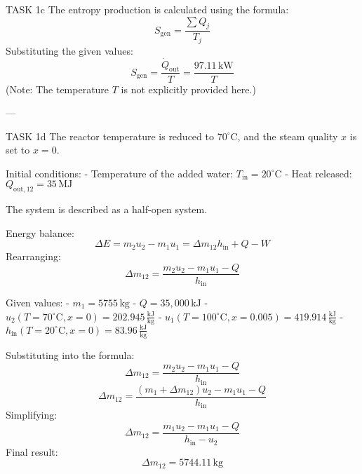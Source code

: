 TASK 1c  
The entropy production is calculated using the formula:  
\[
S_{\text{gen}} = \frac{\sum Q_j}{T_j}
\]  
Substituting the given values:  
\[
S_{\text{gen}} = \frac{\dot{Q}_{\text{out}}}{T} = \frac{97.11 \, \text{kW}}{T}
\]  
(Note: The temperature \( T \) is not explicitly provided here.)

---

TASK 1d  
The reactor temperature is reduced to \( 70^\circ\text{C} \), and the steam quality \( x \) is set to \( x = 0 \).  

Initial conditions:  
- Temperature of the added water: \( T_{\text{in}} = 20^\circ\text{C} \)  
- Heat released: \( Q_{\text{out},12} = 35 \, \text{MJ} \)  

The system is described as a half-open system.  

Energy balance:  
\[
\Delta E = m_2 u_2 - m_1 u_1 = \Delta m_{12} h_{\text{in}} + Q - W
\]  
Rearranging:  
\[
\Delta m_{12} = \frac{m_2 u_2 - m_1 u_1 - Q}{h_{\text{in}}}
\]  

Given values:  
- \( m_1 = 5755 \, \text{kg} \)  
- \( Q = 35,000 \, \text{kJ} \)  
- \( u_2(T=70^\circ\text{C}, x=0) = 202.945 \, \frac{\text{kJ}}{\text{kg}} \)  
- \( u_1(T=100^\circ\text{C}, x=0.005) = 419.914 \, \frac{\text{kJ}}{\text{kg}} \)  
- \( h_{\text{in}}(T=20^\circ\text{C}, x=0) = 83.96 \, \frac{\text{kJ}}{\text{kg}} \)  

Substituting into the formula:  
\[
\Delta m_{12} = \frac{m_2 u_2 - m_1 u_1 - Q}{h_{\text{in}}}
\]  
\[
\Delta m_{12} = \frac{(m_1 + \Delta m_{12}) u_2 - m_1 u_1 - Q}{h_{\text{in}}}
\]  
Simplifying:  
\[
\Delta m_{12} = \frac{m_1 u_2 - m_1 u_1 - Q}{h_{\text{in}} - u_2}
\]  
Final result:  
\[
\Delta m_{12} = 5744.11 \, \text{kg}
\]